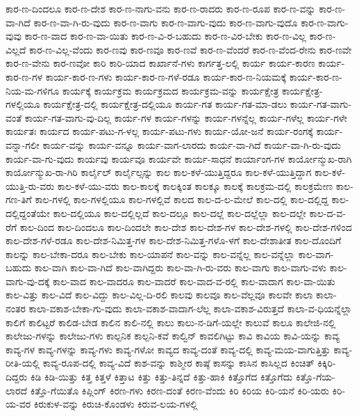{ಕಾರ-ಣ-ದಿಂದಲೂ
ಕಾರ-ಣ-ದೇಶ
ಕಾರ-ಣ-ನಾಗು-ವನು
ಕಾರ-ಣ-ರಾದರು
ಕಾರ-ಣ-ರೂಪ
ಕಾರ-ಣ-ವನ್ನು
ಕಾರ-ಣ-ವಾ-ಗಿದೆ
ಕಾರ-ಣ-ವಾ-ಗಿ-ರು-ವುದು
ಕಾರ-ಣ-ವಾಗು
ಕಾರ-ಣ-ವಾಗು-ವುದು
ಕಾರ-ಣ-ವಾಗು-ವುದೊ
ಕಾರ-ಣ-ವಾಗು-ವುವು
ಕಾರ-ಣ-ವಾದ
ಕಾರ-ಣ-ವಾ-ಯಿತು
ಕಾರ-ಣ-ವಿ-ರ-ಬಹುದು
ಕಾರ-ಣ-ವಿರ-ಬೇಕು
ಕಾರ-ಣ-ವಿಲ್ಲ
ಕಾರ-ಣ-ವಿಲ್ಲದೆ
ಕಾರ-ಣ-ವಿಲ್ಲ-ವೆಂದು
ಕಾರ-ಣವು
ಕಾರ-ಣವೂ
ಕಾರ-ಣವೆ
ಕಾರ-ಣ-ವೆಂದರೆ
ಕಾರ-ಣ-ವೆಂದ-ರೇನು
ಕಾರ-ಣವೇ
ಕಾರ-ಣ-ವೇನು
ಕಾರ-ಣವೋ
ಕಾರಿ
ಕಾರಿ-ಯಾದ
ಕಾರ್ಖಾನೆ-ಗಳು
ಕಾರ್ಗತ್ತ-ಲಲ್ಲಿ
ಕಾರ್ಯ
ಕಾರ್ಯ-ಕಾರಣ
ಕಾರ್ಯ-ಕಾರ-ಣ-ಗಳ
ಕಾರ್ಯ-ಕಾರ-ಣ-ಗಳು
ಕಾರ್ಯ-ಕಾರ-ಣ-ಗಳೆ-ರಡೂ
ಕಾರ್ಯ-ಕಾರ-ಣ-ನಿಯಮಕ್ಕೆ
ಕಾರ್ಯ-ಕಾರ-ಣ-ನಿಯ-ಮ-ಗಳಿಗೂ
ಕಾರ್ಯಕ್ಕೆ
ಕಾರ್ಯಕ್ರಮ
ಕಾರ್ಯಕ್ರಮದ
ಕಾರ್ಯಕ್ರಮ-ವನ್ನು
ಕಾರ್ಯಕ್ಷೇತ್ರ
ಕಾರ್ಯಕ್ಷೇತ್ರ-ಗಳಲ್ಲಿಯೂ
ಕಾರ್ಯಕ್ಷೇತ್ರ-ದಲ್ಲಿ
ಕಾರ್ಯಕ್ಷೇತ್ರ-ದಲ್ಲಿಯೂ
ಕಾರ್ಯ-ಗತ
ಕಾರ್ಯ-ಗತ-ಮಾ-ಡಲು
ಕಾರ್ಯ-ಗತ-ವಾಗು-ವಂತೆ
ಕಾರ್ಯ-ಗತ-ವಾಗು-ವು-ದಿಲ್ಲ
ಕಾರ್ಯ-ಗಳ
ಕಾರ್ಯ-ಗಳನ್ನು
ಕಾರ್ಯ-ಗಳನ್ನೆಲ್ಲ
ಕಾರ್ಯ-ಗಳೆಲ್ಲ
ಕಾರ್ಯ-ಗಳೇ
ಕಾರ್ಯತಃ
ಕಾರ್ಯದ
ಕಾರ್ಯ-ಪಟು-ಗ-ಳಲ್ಲ
ಕಾರ್ಯ-ಪಟು-ಗಳು
ಕಾರ್ಯ-ಯೋ-ಜನೆ
ಕಾರ್ಯ-ರಂಗಕ್ಕೆ
ಕಾರ್ಯ-ವನ್ನಾ-ಗಲೀ
ಕಾರ್ಯ-ವನ್ನು
ಕಾರ್ಯ-ವನ್ನೂ
ಕಾರ್ಯ-ವಾಗ-ಲಾರದು
ಕಾರ್ಯ-ವಾ-ಗಿದೆ
ಕಾರ್ಯ-ವಾ-ಗಿ-ರು-ವುದು
ಕಾರ್ಯ-ವಾ-ಗು-ವುದು
ಕಾರ್ಯವು
ಕಾರ್ಯವೂ
ಕಾರ್ಯವೇ
ಕಾರ್ಯ-ಸಾಧನೆ
ಕಾರ್ಯಾಂಗ-ಗಳ
ಕಾರ್ಯೋನ್ಮುಖ-ರಾಗಿ
ಕಾರ್ಯೋನ್ಮುಖ-ರಾ-ಗಿರಿ
ಕಾರ್ಲೈಲ್
ಕಾರ್ಲೈಲ್ಸನ್ನು
ಕಾಲ
ಕಾಲ-ಕಳೆ-ಯುತ್ತಿದ್ದರೂ
ಕಾಲ-ಕಳೆ-ಯುತ್ತಿದ್ದಾಗ
ಕಾಲ-ಕಳೆ-ಯುತ್ತಿ-ರು-ವರು
ಕಾಲ-ಕಳೆ-ಯು-ವರು
ಕಾಲ-ಕಾಲಕ್ಕೆ
ಕಾಲಕ್ಕಿಂತ
ಕಾಲಕ್ಕೂ
ಕಾಲಕ್ಕೆ
ಕಾಲಕ್ರಮ-ದಲ್ಲಿ
ಕಾಲಕ್ರಮೇಣ
ಕಾಲ-ಗಣ-ತಿಗೆ
ಕಾಲ-ಗಳಲ್ಲಿ
ಕಾಲ-ಗಳಲ್ಲಿಯೂ
ಕಾಲ-ಗಳಲ್ಲಿವೆ
ಕಾಲದ
ಕಾಲ-ದ-ಲ-ಮೇಲೆ
ಕಾಲ-ದಲ್ಲಿ
ಕಾಲ-ದಲ್ಲಿದ್ದ
ಕಾಲ-ದಲ್ಲಿದ್ದಂತೆಯೇ
ಕಾಲ-ದಲ್ಲಿಯೂ
ಕಾಲ-ದಲ್ಲಿಲ್ಲದೆ
ಕಾಲ-ದಲ್ಲೂ
ಕಾಲ-ದಲ್ಲೆ
ಕಾಲ-ದಲ್ಲೆಲ್ಲಾ
ಕಾಲ-ದಲ್ಲೇ
ಕಾಲ-ದ-ವ-ರೆಗೆ
ಕಾಲ-ದಿಂದ
ಕಾಲ-ದಿಂದಲೂ
ಕಾಲ-ದಿಂದಲೇ
ಕಾಲ-ದೇಶ
ಕಾಲ-ದೇಶ-ಗಳ
ಕಾಲ-ದೇಶ-ಗಳಲ್ಲಿ
ಕಾಲ-ದೇಶ-ಗಳಿಂದ
ಕಾಲ-ದೇಶ-ಗಳೆ-ರಡೂ
ಕಾಲ-ದೇಶ-ನಿಮಿತ್ತ-ಗಳ
ಕಾಲ-ದೇಶ-ನಿಮಿತ್ತ-ಗಳೊ-ಳಗೆ
ಕಾಲ-ದೇಶಾತೀತ
ಕಾಲ-ದೊಂದಿಗೆ
ಕಾಲನ್ನು
ಕಾಲ-ಬೇಕಾ-ದರೂ
ಕಾಲ-ಬೇಕು
ಕಾಲ-ಯಾಪನೆ
ಕಾಲ-ವನ್ನು
ಕಾಲ-ವನ್ನೆಲ್ಲ
ಕಾಲ-ವನ್ನೆಲ್ಲಾ
ಕಾಲ-ವಾಗ-ಬಹುದು
ಕಾಲ-ವಾಗಿ
ಕಾಲ-ವಾ-ಗಿದೆ
ಕಾಲ-ವಾಗಿದ್ದರು
ಕಾಲ-ವಾ-ಗಿ-ರು-ವರು
ಕಾಲ-ವಾಗು
ಕಾಲ-ವಾಗು-ವಳು
ಕಾಲ-ವಾಗು-ವು-ದಕ್ಕೆ
ಕಾಲ-ವಾದ
ಕಾಲ-ವಾದರೂ
ಕಾಲ-ವಾದರೆ
ಕಾಲ-ವಾದ-ವ-ರಲ್ಲಿ
ಕಾಲ-ವಾದಾಗ
ಕಾಲ-ವಾ-ಯಿತು
ಕಾಲ-ವಿತ್ತು
ಕಾಲ-ವಿದೆ
ಕಾಲ-ವಿದ್ದು
ಕಾಲ-ವಿಲ್ಲ-ದಿ-ರಲಿ
ಕಾಲವು
ಕಾಲವೂ
ಕಾಲ-ವೆಲ್ಲವೂ
ಕಾಲವೇ
ಕಾಲಾ
ಕಾಲಾ-ನಂತರ
ಕಾಲಾ-ವಕಾಶ-ಬೇಕಾ-ಗು-ವುದು
ಕಾಲಾ-ವಕಾಶ-ವಾದಾಗ-ಲೆಲ್ಲ
ಕಾಲಾ-ವಕಾಶ-ವಿರುತ್ತದೆ
ಕಾಲಾ-ವ-ಧಿಯನ್ನೆಲ್ಲಾ
ಕಾಲಿಗೆ
ಕಾಲಿಟ್ಟರೆ
ಕಾಲಿಡ-ಬೇಡ
ಕಾಲಿನ
ಕಾಲಿ-ನಲ್ಲಿ
ಕಾಲು
ಕಾಲು-ನ-ಡಿಗೆ-ಯಲ್ಲೇ
ಕಾಲುವೆ
ಕಾಲೂ
ಕಾಲೇಜಿ-ನಲ್ಲಿ
ಕಾಲೇಜು-ಗಳನ್ನು
ಕಾಲೇಜು-ಗಳು
ಕಾಲ್ಪನಿಕ
ಕಾಲ್ಪನಿ-ಕವೆ
ಕಾಲ್ವಿನ್
ಕಾವಲಿಗಿಟ್ಟು
ಕಾವಿ
ಕಾವಿಯ
ಕಾವಿ-ಯನ್ನು
ಕಾವ್ಯ
ಕಾವ್ಯ-ಗಳ
ಕಾವ್ಯ-ಗಳನ್ನು
ಕಾವ್ಯ-ಗಳು
ಕಾವ್ಯ-ಗಳೋ
ಕಾವ್ಯದ
ಕಾವ್ಯ-ದಂತೆ
ಕಾವ್ಯ-ದಲ್ಲಿ
ಕಾವ್ಯ-ಮಯ-ವಾಗುತ್ತಿತ್ತು
ಕಾವ್ಯ-ರೀತಿ-ಯಲ್ಲಿ
ಕಾವ್ಯ-ರೂಪ-ದಲ್ಲಿ
ಕಾವ್ಯ-ವಿದೆ
ಕಾಶ-ವನ್ನು
ಕಾಶ್ಮೀರ
ಕಾಷ್ಠೆ
ಕಾಸನ್ನು
ಕಾಸಿನ
ಕಾಸಿಲ್ಲದ
ಕಿಂಚಿತ್
ಕಿಕ್ಕಿರಿ-ದಿದ್ದರು
ಕಿಡಿ
ಕಿಡಿ-ಯಿತ್ತು
ಕಿತ್ತ
ಕಿತ್ತಳೆ
ಕಿತ್ತಾಟ
ಕಿತ್ತು
ಕಿತ್ತು-ತಿನ್ನದೆ
ಕಿತ್ತು-ಹಾಕಿ
ಕಿತ್ತೊಗೆದ
ಕಿತ್ತೊಗೆದು
ಕಿತ್ತೊ-ಗೆಯ-ಲಾರದೆ
ಕಿತ್ತೊ-ಗೆಯಿತೊ
ಕಿಪ್ಲಿಂಗ್
ಕಿರಣ-ಗಳು
ಕಿರಣ-ದಂತೆ
ಕಿರಣ-ವೆಂದು
ಕಿರಿ
ಕಿರಿಯ
ಕಿರಿ-ಯನೆ
ಕಿರಿ-ಯರು
ಕಿರಿ-ಯ-ವರ
ಕಿರುಕುಳ-ವನ್ನು
ಕಿರುಚಿ-ಕೊಂಡಳು
ಕಿರುವ-ಲಯ-ಗಳಲ್ಲಿ
}
